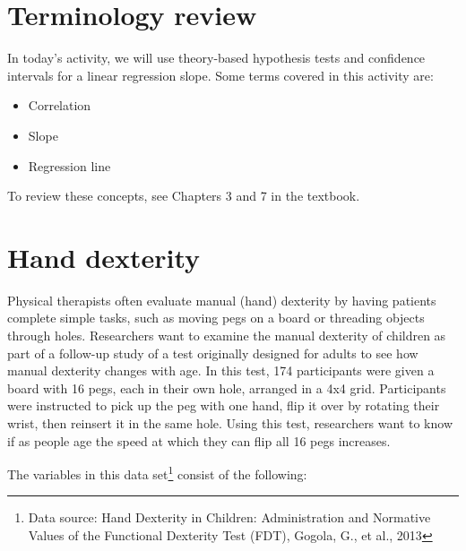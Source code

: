 \documentclass[
]{report}
\begin{document}
\hypertarget{terminology-review}{%
\section{Terminology review}\label{terminology-review}}

In today's activity, we will use theory-based hypothesis tests and confidence intervals for a linear regression slope. Some terms covered in this activity are:

\begin{itemize}
\item
  Correlation
\item
  Slope
\item
  Regression line
\end{itemize}

To review these concepts, see Chapters 3 and 7 in the textbook.

\hypertarget{hand-dexterity-1}{%
\section{Hand dexterity}\label{hand-dexterity-1}}

Physical therapists often evaluate manual (hand) dexterity by having patients complete simple tasks, such as moving pegs on a board or threading objects through holes. Researchers want to examine the manual dexterity of children as part of a follow-up study of a test originally designed for adults to see how manual dexterity changes with age. In this test, 174 participants were given a board with 16 pegs, each in their own hole, arranged in a 4x4 grid. Participants were instructed to pick up the peg with one hand, flip it over by rotating their wrist, then reinsert it in the same hole. Using this test, researchers want to know if as people age the speed at which they can flip all 16 pegs increases.

The variables in this data set\footnote{Data source: Hand Dexterity in Children: Administration and Normative Values of the Functional Dexterity Test (FDT), Gogola, G., et al., 2013} consist of the following:
\end{document}
